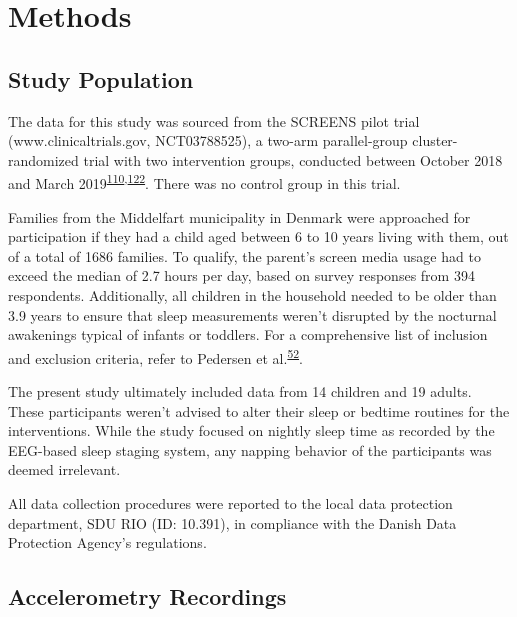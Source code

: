 \documentclass[
  10pt,
]{scrbook}
\begin{document}
\hypertarget{methods}{%
\section{Methods}\label{methods}}

\hypertarget{study-population}{%
\subsection{Study Population}\label{study-population}}

The data for this study was sourced from the SCREENS pilot trial
(www.clinicaltrials.gov, NCT03788525), a two-arm parallel-group
cluster-randomized trial with two intervention groups, conducted between
October 2018 and March
2019\textsuperscript{\protect\hyperlink{ref-rasmussen_short-term_2020}{110},\protect\hyperlink{ref-rasmussen_feasibility_2021}{122}}.
There was no control group in this trial.

Families from the Middelfart municipality in Denmark were approached for
participation if they had a child aged between 6 to 10 years living with
them, out of a total of 1686 families. To qualify, the parent's screen
media usage had to exceed the median of 2.7 hours per day, based on
survey responses from 394 respondents. Additionally, all children in the
household needed to be older than 3.9 years to ensure that sleep
measurements weren't disrupted by the nocturnal awakenings typical of
infants or toddlers. For a comprehensive list of inclusion and exclusion
criteria, refer to Pedersen et
al.\textsuperscript{\protect\hyperlink{ref-pedersen_self-administered_2021}{52}}.

The present study ultimately included data from 14 children and 19
adults. These participants weren't advised to alter their sleep or
bedtime routines for the interventions. While the study focused on
nightly sleep time as recorded by the EEG-based sleep staging system,
any napping behavior of the participants was deemed irrelevant.

All data collection procedures were reported to the local data
protection department, SDU RIO (ID: 10.391), in compliance with the
Danish Data Protection Agency's regulations.

\hypertarget{accelerometry-recordings}{%
\subsection{Accelerometry Recordings}\label{accelerometry-recordings}}
\end{document}

